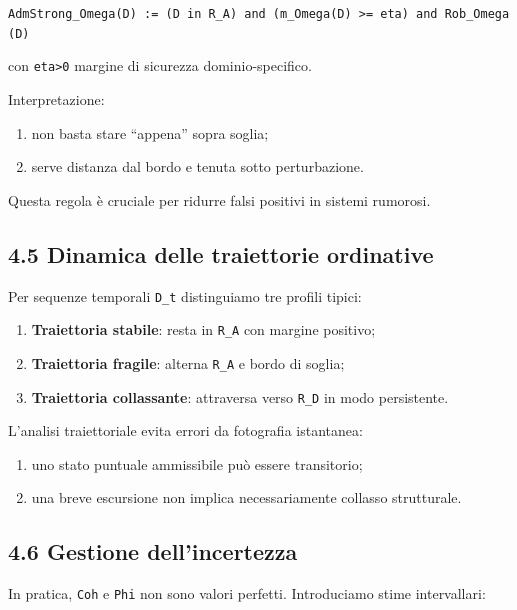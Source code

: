 \texttt{AdmStrong\_Omega(D)\ :=\ (D\ in\ R\_A)\ and\ (m\_Omega(D)\ \textgreater{}=\ eta)\ and\ Rob\_Omega(D)}

con \texttt{eta\textgreater{}0} margine di sicurezza dominio-specifico.

Interpretazione:

\begin{enumerate}
\def\labelenumi{\arabic{enumi}.}
\tightlist
\item
  non basta stare ``appena'' sopra soglia;
\item
  serve distanza dal bordo e tenuta sotto perturbazione.
\end{enumerate}

Questa regola è cruciale per ridurre falsi positivi in sistemi rumorosi.

\subsection{4.5 Dinamica delle traiettorie ordinative}

Per sequenze temporali \texttt{D\_t} distinguiamo tre profili tipici:

\begin{enumerate}
\def\labelenumi{\arabic{enumi}.}
\tightlist
\item
  \textbf{Traiettoria stabile}: resta in \texttt{R\_A} con margine positivo;
\item
  \textbf{Traiettoria fragile}: alterna \texttt{R\_A} e bordo di soglia;
\item
  \textbf{Traiettoria collassante}: attraversa verso \texttt{R\_D} in modo persistente.
\end{enumerate}

L'analisi traiettoriale evita errori da fotografia istantanea:

\begin{enumerate}
\def\labelenumi{\arabic{enumi}.}
\tightlist
\item
  uno stato puntuale ammissibile può essere transitorio;
\item
  una breve escursione non implica necessariamente collasso strutturale.
\end{enumerate}

\subsection{4.6 Gestione dell'incertezza}

In pratica, \texttt{Coh} e \texttt{Phi} non sono valori perfetti. Introduciamo stime intervallari:

